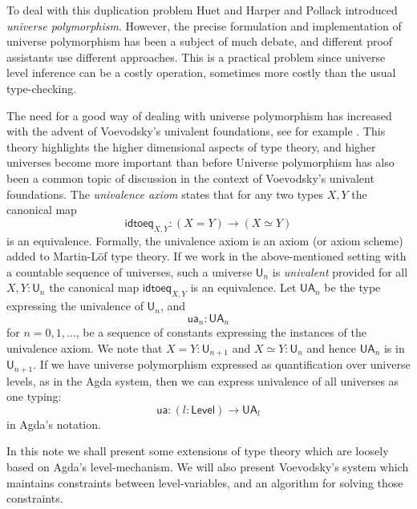 \documentclass[11pt,a4paper]{article}
\def\UU{\mathsf{U}}
\def\Level{\mathsf{Level}}
\newcommand{\idtoeq}{\mathsf{idtoeq}}
\newcommand{\ua}{\mathsf{ua}}
\newcommand{\UA}{\mathsf{UA}}
\begin{document}
To deal with this duplication problem Huet \cite{Huet87} and Harper and Pollack \cite{HarperP91} introduced {\em universe polymorphism}. However, the precise formulation and implementation of universe polymorphism has been a subject of much debate, and different proof assistants use different approaches. This is a practical problem since universe level inference can be a costly operation, sometimes more costly than the usual type-checking.


The need for a good way of dealing with universe polymorphism has increased with the advent of Voevodsky's univalent foundations, see for example \cite{VV}. This theory highlights the higher dimensional aspects of type theory, and higher universes become more important than before
Universe polymorphism has also been a common topic of discussion in the context of Voevodsky's univalent foundations. The {\em univalence axiom} states that for any two types $X,Y$ the canonical map
$$
\idtoeq_{X,Y} : (X=Y)\to (X\simeq Y)
$$
is an equivalence. Formally, the univalence axiom is an axiom (or axiom scheme) added to Martin-Löf type theory. If we work in the above-mentioned setting with a countable sequence of universes, such a universe $\UU_n$ is {\em univalent} provided for all $X,Y : \UU_n$ the canonical map $\idtoeq_{X,Y}$ is an equivalence. Let $\UA_n$ be the type expressing the univalence of $\UU_n$, and
$$
\ua_n : \UA_n
$$
for $n = 0,1,\ldots$, be a sequence of constants expressing the instances of the univalence axiom. We note that $X = Y : \UU_{n+1}$ and $X\simeq Y : \UU_n$ and hence $\UA_n$ is in $\UU_{n+1}$. If we have universe polymorphism expressed as quantification over universe levels, as in the Agda system, then we can express univalence of all universes as one typing:
$$
\ua : (l : \Level) \to \UA_l
$$
in Agda's notation.

In this note we shall present some extensions of type theory which are loosely based on Agda's level-mechanism. We will also present Voevodsky's system \cite{VV} which maintains constraints between level-variables, and an algorithm for solving those constraints.
\end{document}
